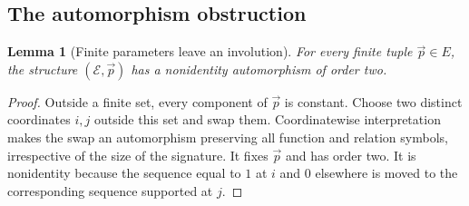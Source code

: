 \documentclass[11pt,letterpaper]{article}
\newtheorem{lemma}[theorem]{Lemma}
\theoremstyle{definition}\newtheorem{definition}[theorem]{Definition}
\theoremstyle{remark}\newtheorem{remark}[theorem]{Remark}
\begin{document}
\subsection{The automorphism obstruction}

\begin{lemma}[Finite parameters leave an involution]
\label{lem:pp-involution}
For every finite tuple $\vec p\in E$, the structure
$(\mathcal E,\vec p)$ has a nonidentity automorphism of order two.
\end{lemma}
\begin{proof}
Outside a finite set, every component of $\vec p$ is constant.  Choose
two distinct coordinates $i,j$ outside this set and swap them.
Coordinatewise interpretation makes the swap an automorphism preserving
all function and relation symbols, irrespective of the size of the
signature.  It fixes $\vec p$ and has order two.  It is nonidentity
because the sequence equal to $1$ at $i$ and $0$ elsewhere is moved to
the corresponding sequence supported at $j$.
\end{proof}
\end{document}
